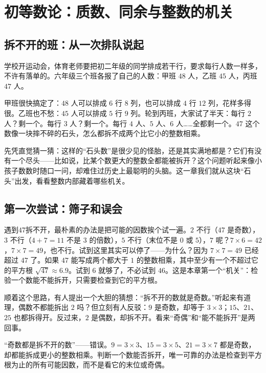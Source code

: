 \chapter{初等数论：质数、同余与整数的机关}

\section{拆不开的班：从一次排队说起}

学校开运动会，体育老师要把初二年级的同学排成若干行，要求每行人数一样多，不许有落单的。六年级三个班各报了自己的人数：甲班 $48$ 人，乙班 $45$ 人，丙班 $47$ 人。

甲班很快搞定了：$48$ 人可以排成 $6$ 行 $8$ 列，也可以排成 $4$ 行 $12$ 列，花样多得很。乙班也不愁：$45$ 人可以排成 $5$ 行 $9$ 列。轮到丙班，大家试了半天：每行 $2$ 人？剩一个。每行 $3$ 人？剩一个。每行 $4$ 人、$5$ 人、$6$ 人……全都剩一个。$47$ 这个数像一块摔不碎的石头，怎么都拆不成两个比它小的整数相乘。

先凭直觉猜一猜：这样的“石头数”是很少见的怪胎，还是其实满地都是？它们有没有一个尽头——比如说，比某个数更大的整数全都能被拆开？这个问题听起来像小孩子数数时随口一问，却难住过历史上最聪明的头脑。这一章我们就从这块“石头”出发，看看整数内部藏着哪些机关。

\section{第一次尝试：筛子和误会}

遇到$47$拆不开，最朴素的办法是把可能的因数挨个试一遍。$2$ 不行（$47$ 是奇数），$3$ 不行（$4+7=11$ 不是 $3$ 的倍数），$5$ 不行（末位不是 $0$ 或 $5$），$7$ 呢？$7\times 6=42$，$7\times 7=49$，也不行。试到这里其实可以停了——为什么？因为 $7\times 7=49$ 已经超过 $47$ 了。如果 $47$ 能写成两个都大于 $1$ 的整数相乘，其中至少有一个不超过它的平方根 $\sqrt{47}\approx 6.9$。试到 $6$ 就够了，不必试到 $46$。这是本章第一个“机关”：检验一个数能不能拆开，只需要检查到它的平方根。

顺着这个思路，有人提出一个大胆的猜想：“拆不开的数就是奇数。”听起来有道理，偶数不都能拆出 $2$ 吗？但立刻有人反驳：$9$ 是奇数，却等于 $3\times 3$；$15$、$21$、$25$ 也都拆得开。反过来，$2$ 是偶数，却拆不开。看来“奇偶”和“能不能拆开”是两回事。

\begin{fanli}
“奇数都是拆不开的数”——错误。$9=3\times3$、$15=3\times5$、$21=3\times7$ 都是奇数，却都能拆成更小的整数相乘。判断一个数能否拆开，唯一可靠的办法是检查到平方根为止的所有可能因数，而不是看它的末位或奇偶。
\end{fanli}

